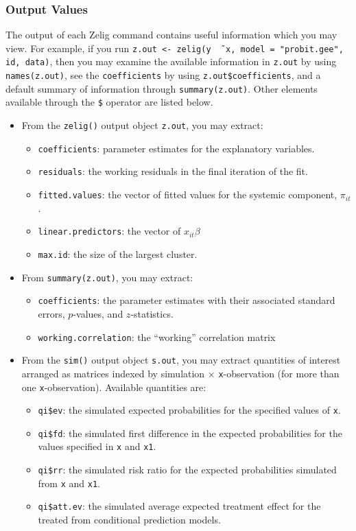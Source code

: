 \subsubsection{Output Values}

The output of each Zelig command contains useful information which you
may view.  For example, if you run \texttt{z.out <- zelig(y \~\, x,
  model = "probit.gee", id, data)}, then you may examine the available
information in \texttt{z.out} by using \texttt{names(z.out)},
see the {\tt coefficients} by using {\tt z.out\$coefficients}, and
a default summary of information through \texttt{summary(z.out)}.
Other elements available through the {\tt \$} operator are listed
below.

\begin{itemize}
\item From the {\tt zelig()} output object {\tt z.out}, you may
  extract:
   \begin{itemize}
   \item {\tt coefficients}: parameter estimates for the explanatory
     variables.
   \item {\tt residuals}: the working residuals in the final iteration
     of the fit.
   \item {\tt fitted.values}: the vector of fitted values for the
     systemic component, $\pi_{it}$.
   \item {\tt linear.predictors}: the vector of $x_{it}\beta$
   \item {\tt max.id}: the size of the largest cluster.
   \end{itemize}

\item From {\tt summary(z.out)}, you may extract:
   \begin{itemize}
   \item {\tt coefficients}: the parameter estimates with their
     associated standard errors, $p$-values, and $z$-statistics.
   \item {\tt working.correlation}: the ``working'' correlation matrix
   \end{itemize}

\item From the {\tt sim()} output object {\tt s.out}, you may extract
  quantities of interest arranged as matrices indexed by simulation
  $\times$ {\tt x}-observation (for more than one {\tt x}-observation).
  Available quantities are:

   \begin{itemize}
   \item {\tt qi\$ev}: the simulated expected probabilities for the
     specified values of {\tt x}.
   \item {\tt qi\$fd}: the simulated first difference in the expected
     probabilities for the values specified in {\tt x} and {\tt x1}.
   \item {\tt qi\$rr}: the simulated risk ratio for the expected
     probabilities simulated from {\tt x} and {\tt x1}.
   \item {\tt qi\$att.ev}: the simulated average expected treatment
     effect for the treated from conditional prediction models.
   \end{itemize}
\end{itemize}

